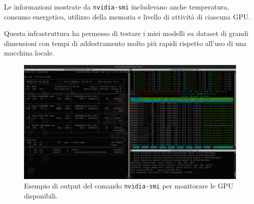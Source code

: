 Le informazioni mostrate da \texttt{nvidia-smi} includevano anche temperatura, consumo energetico, utilizzo della memoria e livello di attività di ciascuna GPU. 

Questa infrastruttura ha permesso di testare i miei modelli su dataset di grandi dimensioni con tempi di addestramento molto più rapidi rispetto all’uso di una macchina locale.

\begin{figure}[H] 
  	\centering 
 	\includegraphics[width=\textwidth]{images/2025-07-07-09-52-55.png} 
	 \caption{Esempio di output del comando \texttt{nvidia-smi} per monitorare le GPU disponibili.}
	 \label{fig:gpu_info}
 \end{figure} 